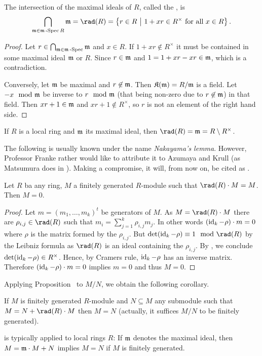 \documentclass[a4paper,parskip=half,numbers=enddot, DIV=12]{scrreprt}
\begin{document}
\begin{prop}
    The intersection of the maximal ideals of $R$, called the , is
    \begin{align}\lbl{eq:JacobsonRadical}
        \bigcap_{\mm \in\mSpec R} \mm = \rad(R) = \left\{r\in R\st1+xr\in R^\times \text{ for all } x\in R\right\}.
    \end{align}
\end{prop}
\begin{proof}
    Let $r\in \bigcap_{\mathfrak{m}\in\mathfrak{m}\operatorname{-Spec}} \mathfrak{m}$ and $x\in R$. If $1+xr\not\in R^\times$ it must be contained in some maximal ideal $\mathfrak{m}$ or $R$. Since $r\in\mathfrak{m}$ and $1 = 1+xr - xr\in\mathfrak{m}$, which is a contradiction. 
    
    Conversely, let $\mathfrak{m}$ be maximal and $r\not\in\mathfrak{m}$. Then $\mathfrak{K}(\mathfrak{m}) = R/\mathfrak{m}$ is a field. Let $-x\mod {\mathfrak{m}}$ be inverse to $r\mod{\mathfrak{m}}$ (that being non-zero due to $r\not\in\mathfrak{m}$) in that field. Then $xr+1\in\mathfrak{m}$ and $xr+1\not\in R^\times$, so $r$ is not an element of the right hand side.
\end{proof}
\begin{example}
    If $R$ is a local ring and $\mathfrak{m}$ its maximal ideal, then $\rad (R) = \mm = R\setminus R^\times$.
\end{example}
The following is usually known under the name \emph{Nakayama's lemma}. However, Professor Franke rather would like to attribute it to Azumaya and Krull (as Matsumura does in \cite{matsumuraCRT}). Making a compromise, it will, from now on, be cited as \NAK.
\begin{prop}
        Let $R$ ba any ring, $M$ a finitely generated $R$-module such that $\rad(R)\cdot M = M$. Then $M=0$.
\end{prop}
\begin{proof}
    Let $m=(m_1,\ldots,m_k)^t$ be generators of $M$. As $M=\rad(R) \cdot M$ there are $\rho_{i,j}\in\rad(R)$ such that $m_i = \sum_{j=1}^k \rho_{i,j} m_j$. In other words $(\operatorname{id}_k -\rho)\cdot m=0$ where $\rho$ is the matrix formed by the $\rho_{i,j}$. But $\det(\id_k - \rho) \equiv 1\mod \rad(R)$ by the Leibniz formula as $\rad(R)$ is an ideal containing the $\rho_{i,j}$. By , we conclude $\operatorname{det}(\operatorname{id}_k -\rho)\in R^\times$. Hence, by Cramers rule, $\operatorname{id}_k-\rho$ has an inverse matrix. Therefore $(\operatorname{id}_k -\rho) \cdot m = 0$ implies $m=0$ and thus $M=0$.
\end{proof}
Applying Proposition~ to $M/N$, we obtain the following corollary.
\begin{cor}
    If $M$ is finitely generated $R$-module and $N\subseteq M$ any submodule such that $M = N+\rad(R)\cdot M$ then $M=N$ (actually, it suffices $M/N$ to be finitely generated).
\end{cor}
\begin{rem*}
    {\NAK} is typically applied to local rings $R$: If $\mathfrak{m}$ denotes the maximal ideal, then $M= \mathfrak{m}\cdot M +N$ implies $M=N$ if $M$ is finitely generated.
\end{rem*}
\end{document}
